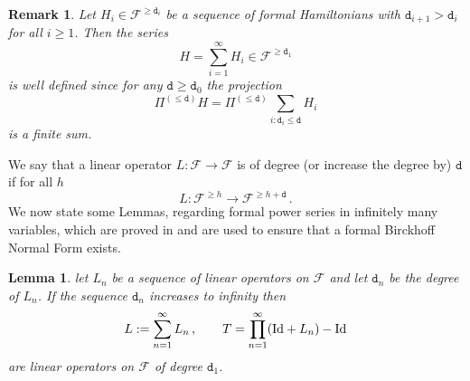 \documentclass[reqno,11pt]{amsart}
\theoremstyle{plain}
\numberwithin{equation}{section}
\newtheorem{rmk}[thm]{Remark}
\newtheorem{lemma}[theorem]{Lemma}
\newcommand{\N}{\mathbb{N}}
\newcommand{\Z}{\mathbb{Z}}
\newcommand{\id}{{\rm Id}}
\newcommand{\be}{{\bf e}}
\newcommand{\cF}{{\mathcal F}}
\newcommand{\td}{{\mathtt{d}}}
\newcommand{\al}{{\alpha}}
\newcommand{\bt}{{\beta}}
\newcommand{\pa}[1]{{\left(#1\right)}}
\begin{document}
{%
\begin{rmk}\label{gogna}
	Let $H_i\in \cF^{\geq \td_i}$ be a sequence of formal Hamiltonians with  $\td_{i+1}> \td_i$ for all $i\geq 1$. Then the series
	\[
	H= \sum_{i=1}^\infty H_i \in \cF^{\geq \td_1}
	\]
	is well defined since for any $\td\geq \td_0$ the projection
	\[\Pi^{(\leq \td)} H = \Pi^{(\leq \td)} \sum_{i: \td_i \leq \td}  H_i  \] is a finite sum.
\end{rmk}
We say that  a linear operator $L:\cF\to \cF$ is of degree (or increase the degree by) $\td$  if for all $h$ 
\[
L:\cF^{ \geq h} \to \cF^{ \geq h+\td}\,.
\]
We now state some Lemmas, regarding formal power series in infinitely many variables, which are proved in \cite{ProcesiStolo} and are used to ensure that a formal Birckhoff Normal Form exists.
\begin{lemma}\label{lemniscata}
	let $L_n$ be a sequence of linear operators on $\cF$  and let  $\td_n$ be the degree of $L_n$. If the sequence $\td_n$ increases to infinity then 
	\[
	L:= \sum_{n=1}^\infty L_n \,,\qquad T =\prod_{n=1}^\infty (\id + L_n)-\id 
	\]
	are  linear operators on $\cF$ of degree  $\td_1$.

\end{lemma}}
\end{document}
